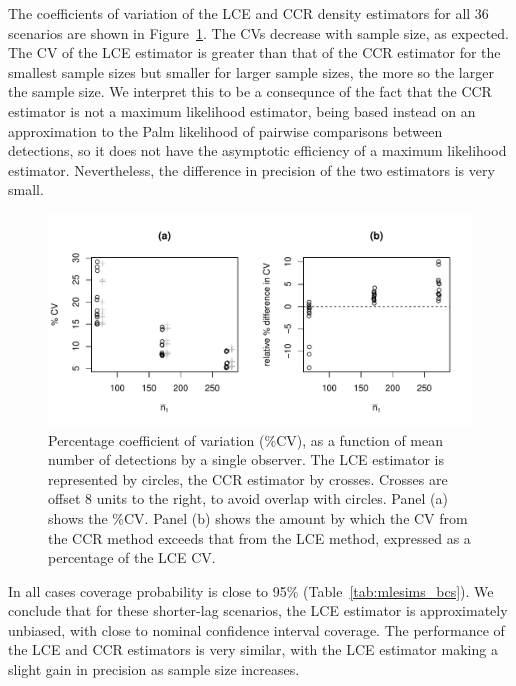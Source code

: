 \documentclass[useAMS, usenatbib, referee]{biom}\usepackage[]{graphicx}\usepackage[]{color}
\makeatletter
\def\maxwidth{ %
  \ifdim\Gin@nat@width>\linewidth
    \linewidth
  \else
    \Gin@nat@width
  \fi
}
\newenvironment{knitrout}{}{} %
\makeatother
\begin{document}
The coefficients of variation of the LCE and CCR density estimators for all 36 scenarios are shown in Figure~\ref{fig:fig_mlepalm_cv_bcs}. The CVs decrease with sample size, as expected. The CV of the LCE estimator is greater than that of the CCR estimator for the smallest sample sizes but smaller for larger sample sizes, the more so the larger the sample size. We interpret this to be a consequnce of the fact that the CCR estimator is not a maximum likelihood estimator, being based instead on an approximation to the Palm likelihood of pairwise comparisons between detections, so it does not have the asymptotic efficiency of a maximum likelihood estimator. Nevertheless, the difference in precision of the two estimators is very small.

\begin{knitrout}
\color{fgcolor}\begin{figure}

{\centering \includegraphics[width=\maxwidth]{figs/fig_mlepalm_cv_bcs-1} 

}

\caption[Percentage coefficient of variation (\%CV), as a function of mean number of detections by a single observer]{Percentage coefficient of variation (\%CV), as a function of mean number of detections by a single observer. The LCE estimator is represented by circles, the CCR estimator by crosses. Crosses are offset 8 units to the right, to avoid overlap with circles. Panel (a) shows the \%CV. Panel (b) shows the amount by which the CV from the CCR method exceeds that from the LCE method, expressed as a percentage of the LCE CV.}\label{fig:fig_mlepalm_cv_bcs}
\end{figure}


\end{knitrout}


In all cases coverage probability is close to 95\% (Table~\ref{tab:mlesims_bcs}). We conclude that for these shorter-lag scenarios, the LCE estimator is approximately unbiased, with close to nominal confidence interval coverage. The performance of the LCE and CCR estimators is very similar, with the LCE estimator making a slight gain in precision as sample size increases.
\end{document}
